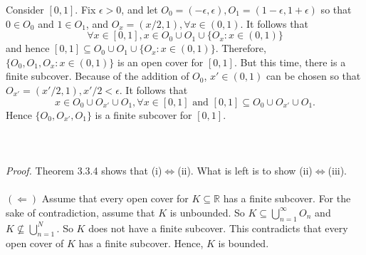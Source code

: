 \documentclass{article}
\begin{document}
            Consider $[0,1]$. Fix $\epsilon > 0$, and let $O_0 = (-\epsilon, \epsilon), O_1 = (1-\epsilon, 1+\epsilon)$ so that $0 \in O_0$ and $1 \in O_1$, and $O_x = (x/2, 1), \forall x \in (0,1)$.
            It follows that 
            \begin{equation*}
                \forall x \in [0,1], x \in O_0 \cup O_1 \cup \{O_x: x \in (0,1)\}
            \end{equation*}
            and hence $[0,1] \subseteq O_0 \cup O_1 \cup \{O_x: x \in (0,1)\}$. Therefore, $\{O_0, O_1, O_x: x \in (0,1)\}$ is an open cover for $[0,1]$. But this time, there is a finite subcover. Because of the addition of $O_0$, $x' \in (0,1)$ can be chosen so that $O_{x'} = (x'/2,1), x'/2 < \epsilon$. It follows that 
            \begin{equation*}
                x \in O_0 \cup O_{x'} \cup O_1, \forall x \in [0,1] \text{ and } [0,1] \subseteq O_0 \cup O_{x'} \cup O_1.
            \end{equation*}
            Hence $\{O_0,O_{x'},O_1\}$ is a finite subcover for $[0,1]$.
            \\ \\
            \\ \\
            \textit{Proof.} Theorem 3.3.4 shows that (i)$\iff$(ii). What is left is to show (ii)$\iff$(iii).
            \\ \\
            $(\Leftarrow)$ Assume that every open cover for $K \subseteq \mathbb{R}$ has a finite subcover. For the sake of contradiction, assume that $K$ is unbounded. So $K \subseteq \bigcup_{n=1}^\infty O_n$ and $K \nsubseteq \bigcup_{n=1}^N$. So $K$ does not have a finite subcover. This contradicts that every open cover of $K$ has a finite subcover. Hence, $K$ is bounded.
            
\end{document}
